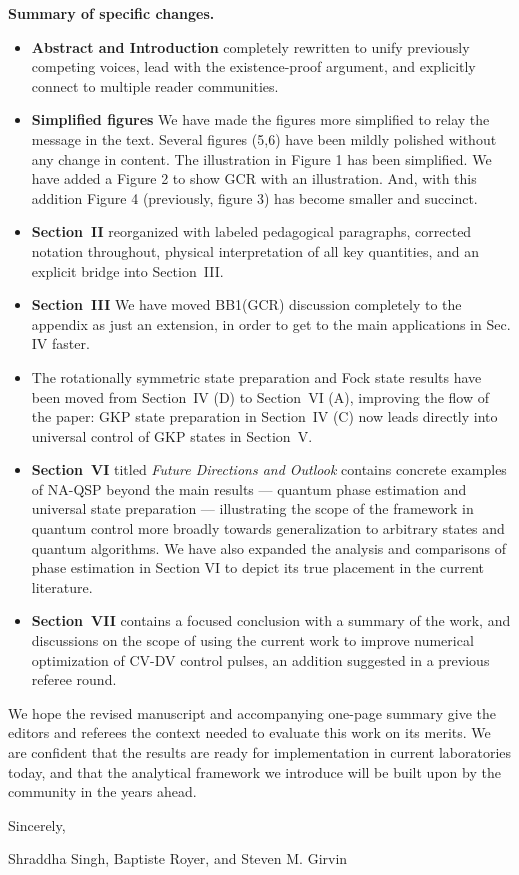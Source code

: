 \documentclass[11pt, letterpaper]{article}
\begin{document}
\textbf{Summary of specific changes.}
\begin{itemize}
    \item \textbf{Abstract and Introduction} completely rewritten to unify previously competing voices, lead with the existence-proof argument, and explicitly connect to multiple reader communities.
    \item \textbf{Simplified figures} We have made the figures more simplified to relay the message in the text. Several figures (5,6) have been mildly polished without any change in content. The illustration in Figure 1 has been simplified. We have added a Figure 2 to show GCR with an illustration. And, with this addition Figure 4 (previously, figure 3) has become smaller and succinct. 
    \item \textbf{Section~II} reorganized with labeled pedagogical paragraphs, corrected notation throughout, physical interpretation of all key quantities, and an explicit bridge into Section~III.
    \item \textbf{Section~III} We have moved BB1(GCR) discussion completely to the appendix as just an extension, in order to get to the main applications in Sec. IV faster.
    \item The rotationally symmetric state preparation and Fock state results have been moved from Section~IV (D) to Section~VI (A), improving the flow of the paper: GKP state preparation in Section~IV (C) now leads directly into universal control of GKP states in Section~V.
    \item \textbf{Section~VI} titled \textit{Future Directions and Outlook} contains concrete examples of NA-QSP beyond the main results --- quantum phase estimation and universal state preparation --- illustrating the scope of the framework in quantum control more broadly towards generalization to arbitrary states and quantum algorithms. We have also expanded the analysis and comparisons of phase estimation in Section VI to depict its true placement in the current literature.
    \item \textbf{Section~VII} contains a focused conclusion with a summary of the work, and discussions on the scope of using the current work to improve numerical optimization of CV-DV control pulses, an addition suggested in a previous referee round.
\end{itemize}

We hope the revised manuscript and accompanying one-page summary give the editors and referees the context needed to evaluate this work on its merits. We are confident that the results are ready for implementation in current laboratories today, and that the analytical framework we introduce will be built upon by the community in the years ahead.

\vspace{12pt}
\noindent
Sincerely,

\vspace{6pt}
\noindent
Shraddha Singh, Baptiste Royer, and Steven M. Girvin

 

\end{document}
